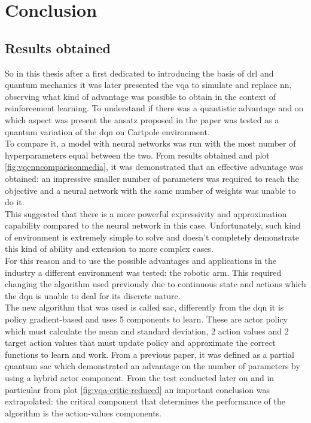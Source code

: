\section{Conclusion}
\subsection{Results obtained}
So in this thesis after a first dedicated to introducing the basis of \acrlong{drl} and quantum mechanics it was later presented the \acrlong{vqa} to simulate and replace \acrlong{nn}, observing what kind of advantage was possible to obtain in the context of reinforcement learning.
To understand if there was a quantistic advantage and on which aspect was present the ansatz proposed in the paper \cite{Scholik_2022} was tested as a quantum variation of the \acrlong{dqn} on Cartpole environment.\\
To compare it, a model with neural networks was run with the most number of hyperparameters equal between the two. From results obtained and plot \ref{fig:vqcnncomparisonmedia}, it was demonstrated that an effective advantage was obtained: an impressive smaller number of parameters was required to reach the objective and a neural network with the same number of weights was unable to do it.\\
This suggested that there is a more powerful expressivity and approximation capability compared to the neural network in this case. Unfortunately, such kind of environment is extremely simple to solve and doesn't completely demonstrate this kind of ability and extension to more complex cases.\\
For this reason and to use the possible advantages and applications in the industry a different environment was tested: the robotic arm. This required changing the algorithm used previously due to continuous state and actions which the \acrshort{dqn} is unable to deal for its discrete nature.\\
The new algorithm that was used is called \acrfull{sac}, differently from the \acrshort{dqn} it is policy gradient-based and uses 5 components to learn. These are actor policy which must calculate the mean and standard deviation, 2 action values and 2 target action values that must update policy and approximate the correct functions to learn and work.
From a previous paper, \cite{https://doi.org/10.48550/arxiv.2112.11921} it was defined as a partial quantum \acrshort{sac} which demonstrated an advantage on the number of parameters by using a hybrid actor component. From the test conducted later on and in particular from plot \ref{fig:vqa-critic-reduced} an important conclusion was extrapolated: the critical component that determines the performance of the algorithm is the action-values components.
